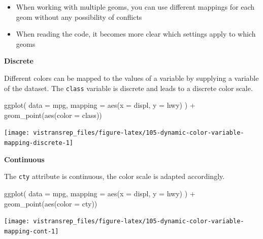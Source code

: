 \documentclass[]{book}
\newenvironment{Shaded}{}{}
\newcommand{\DataTypeTok}[1]{#1}
\newcommand{\KeywordTok}[1]{\textcolor[rgb]{0.00,0.00,1.00}{#1}}
\newcommand{\NormalTok}[1]{#1}
\newcommand{\OperatorTok}[1]{#1}
\newcommand{\StringTok}[1]{\textcolor[rgb]{0.00,0.50,0.50}{#1}}
\providecommand{\tightlist}{%
  \setlength{\itemsep}{0pt}\setlength{\parskip}{0pt}}
\begin{document}
\begin{itemize}
\tightlist
\item
  When working with multiple geoms, you can use different mappings for each geom without any possibility of conflicts
\item
  When reading the code, it becomes more clear which settings apply to which geoms
\end{itemize}

\textbf{Discrete}

Different colors can be mapped to the values of a variable by supplying a variable of the dataset.
The \texttt{class} variable is discrete and leads to a discrete color scale.

\begin{Shaded}
\begin{Highlighting}[]
\KeywordTok{ggplot}\NormalTok{(}
  \DataTypeTok{data =}\NormalTok{ mpg,}
  \DataTypeTok{mapping =} \KeywordTok{aes}\NormalTok{(}\DataTypeTok{x =}\NormalTok{ displ, }\DataTypeTok{y =}\NormalTok{ hwy)}
\NormalTok{) }\OperatorTok{+}
\StringTok{  }\KeywordTok{geom_point}\NormalTok{(}\KeywordTok{aes}\NormalTok{(}\DataTypeTok{color =}\NormalTok{ class))}
\end{Highlighting}
\end{Shaded}

\begin{flushright}\texttt{[image: vistransrep\_files/figure-latex/105-dynamic-color-variable-mapping-discrete-1]} \end{flushright}

\textbf{Continuous}

The \texttt{cty} attribute is continuous, the color scale is adapted accordingly.

\begin{Shaded}
\begin{Highlighting}[]
\KeywordTok{ggplot}\NormalTok{(}
  \DataTypeTok{data =}\NormalTok{ mpg,}
  \DataTypeTok{mapping =} \KeywordTok{aes}\NormalTok{(}\DataTypeTok{x =}\NormalTok{ displ, }\DataTypeTok{y =}\NormalTok{ hwy)}
\NormalTok{) }\OperatorTok{+}
\StringTok{  }\KeywordTok{geom_point}\NormalTok{(}\KeywordTok{aes}\NormalTok{(}\DataTypeTok{color =}\NormalTok{ cty))}
\end{Highlighting}
\end{Shaded}

\begin{flushright}\texttt{[image: vistransrep\_files/figure-latex/105-dynamic-color-variable-mapping-cont-1]} \end{flushright}
\end{document}
